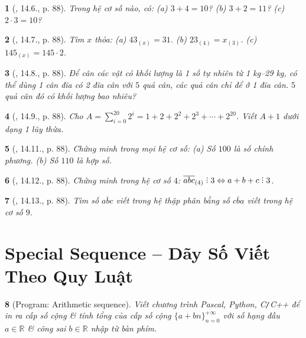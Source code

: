 \documentclass{article}
\newtheorem{baitoan}{}
\DeclareRobustCommand{\divby}{%
	\mathrel{\vbox{\baselineskip.65ex\lineskiplimit0pt\hbox{.}\hbox{.}\hbox{.}}}%
}
\begin{document}
\begin{baitoan}[\cite{TLCT_THCS_Toan_6_so_hoc}, 14.6., p. 88]
	Trong hệ cơ số nào, có: (a) $3 + 4 = 10$? (b) $3 + 2 = 11$? (c) $2\cdot3 = 10$?
\end{baitoan}

\begin{baitoan}[\cite{TLCT_THCS_Toan_6_so_hoc}, 14.7., p. 88]
	Tìm $x$ thỏa: (a) $43_{(x)} = 31$. (b) $23_(4) = x_{(3)}$. (c) $145_{(x)} = 145\cdot2$.
\end{baitoan}

\begin{baitoan}[\cite{TLCT_THCS_Toan_6_so_hoc}, 14.8., p. 88]
	Để cân các vật có khối lượng là 1 số tự nhiên từ {\rm1 kg--29 kg}, có thể dùng 1 cân đĩa có 2 đĩa cân với $5$ quả cân, các quả cân chỉ để ở 1 đĩa cân. $5$ quả cân đó có khối lượng bao nhiêu?
\end{baitoan}

\begin{baitoan}[\cite{TLCT_THCS_Toan_6_so_hoc}, 14.9., p. 88]
	Cho $A = \sum_{i=0}^{20} 2^i = 1 + 2 + 2^2 + 2^3 + \cdots + 2^{20}$. Viết $A + 1$ dưới dạng 1 lũy thừa.
\end{baitoan}

\begin{baitoan}[\cite{TLCT_THCS_Toan_6_so_hoc}, 14.11., p. 88]
	Chứng minh trong mọi hệ cơ số: (a) Số $100$ là số chính phương. (b) Số $110$ là hợp số.
\end{baitoan}

\begin{baitoan}[\cite{TLCT_THCS_Toan_6_so_hoc}, 14.12., p. 88]
	Chứng minh trong hệ cơ số $4$: $\overline{abc}_{(4)}\divby3\Leftrightarrow a + b + c\divby3$.
\end{baitoan}

\begin{baitoan}[\cite{TLCT_THCS_Toan_6_so_hoc}, 14.13., p. 88]
	Tìm số $\overline{abc}$ viết trong hệ thập phân bằng số $\overline{cba}$ viết trong hệ cơ số $9$.
\end{baitoan}


\section{Special Sequence -- Dãy Số Viết Theo Quy Luật}

\begin{baitoan}[{\sf Program}: Arithmetic sequence]
	Viết chương trình {\sf Pascal, Python, C{\tt/}C++} để in ra cấp số cộng \& tính tổng của cấp số cộng $\{a + bn\}_{n=0}^{+\infty}$ với số hạng đầu $a\in\mathbb{R}$ \& công sai $b\in\mathbb{R}$ nhập từ bàn phím.
\end{baitoan}
\end{document}
